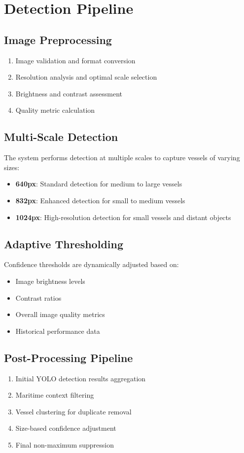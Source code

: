 \documentclass[12pt,a4paper]{report}
\begin{document}
\section{Detection Pipeline}

\subsection{Image Preprocessing}
\begin{enumerate}
    \item Image validation and format conversion
    \item Resolution analysis and optimal scale selection
    \item Brightness and contrast assessment
    \item Quality metric calculation
\end{enumerate}

\subsection{Multi-Scale Detection}
The system performs detection at multiple scales to capture vessels of varying sizes:
\begin{itemize}
    \item \textbf{640px}: Standard detection for medium to large vessels
    \item \textbf{832px}: Enhanced detection for small to medium vessels
    \item \textbf{1024px}: High-resolution detection for small vessels and distant objects
\end{itemize}

\subsection{Adaptive Thresholding}
Confidence thresholds are dynamically adjusted based on:
\begin{itemize}
    \item Image brightness levels
    \item Contrast ratios
    \item Overall image quality metrics
    \item Historical performance data
\end{itemize}

\subsection{Post-Processing Pipeline}
\begin{enumerate}
    \item Initial YOLO detection results aggregation
    \item Maritime context filtering
    \item Vessel clustering for duplicate removal
    \item Size-based confidence adjustment
    \item Final non-maximum suppression
\end{enumerate}
\end{document}
